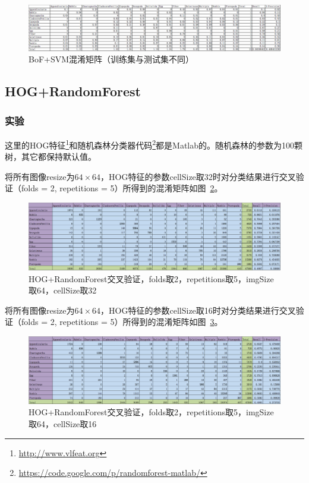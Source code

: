 \documentclass[12pt]{article}
\begin{document}
\begin{figure}[!ht]
\centering
\includegraphics[width=1.0\linewidth]{Test-CM-BoF-SVM-Linear}
\caption{BoF+SVM混淆矩阵（训练集与测试集不同）}
\label{fig:Test-CM-BoF-SVM-Linear}
\end{figure}


\subsection{HOG+RandomForest}

\subsubsection{实验}

这里的HOG特征\footnote{\url{http://www.vlfeat.org}}和随机森林分类器代码\footnote{\url{https://code.google.com/p/randomforest-matlab/}}都是Matlab的。随机森林的参数为100颗树，其它都保持默认值。

将所有图像resize为$64 \times 64$，HOG特征的参数cellSize取32时对分类结果进行交叉验证（folds = 2, repetitions = 5）所得到的混淆矩阵如图~\ref{fig: HOG-RF-2-folds-5-repetitions-32-64}。
\begin{figure}[!ht]
\centering
\includegraphics[width=1.0\linewidth]{HOG-RF-2-folds-5-repetitions-32-64}
\caption{HOG+RandomForest交叉验证，folds取2，repetitions取5，imgSize取64，cellSize取32}
\label{fig: HOG-RF-2-folds-5-repetitions-32-64}
\end{figure}

将所有图像resize为$64 \times 64$，HOG特征的参数cellSize取16时对分类结果进行交叉验证（folds = 2, repetitions = 5）所得到的混淆矩阵如图~\ref{fig: HOG-RF-2-folds-5-repetitions-16-64}。
\begin{figure}[!ht]
\centering
\includegraphics[width=1.0\linewidth]{HOG-RF-2-folds-5-repetitions-16-64}
\caption{HOG+RandomForest交叉验证，folds取2，repetitions取5，imgSize取64，cellSize取16}
\label{fig: HOG-RF-2-folds-5-repetitions-16-64}
\end{figure}
\end{document}
